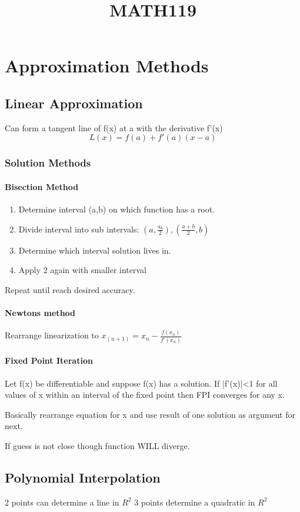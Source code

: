 \documentclass{article}
\begin{document}
\title{MATH119}

\section{Approximation Methods}
\subsection{Linear Approximation}
Can form a tangent line of f(x) at a with the derivative f'(x)
\begin{equation}
L(x)=f(a)+f'(a)(x-a)
\end{equation}
\subsubsection{Solution Methods}
\paragraph{Bisection Method}
\begin{enumerate}
\item Determine interval (a,b) on which function has a root.
\item Divide interval into sub intervals: $(a,\frac{a_b}{2}),(\frac{a+b}{2},b)$
\item Determine which interval solution lives in.
\item Apply 2 again with smaller interval
\end{enumerate}
Repeat until reach desired accuracy.
\paragraph{Newtons method}
Rearrange linearization to $x_(n+1)=x_n-\frac{f(x_n)}{f'(x_n)}$
\paragraph{Fixed Point Iteration}
Let f(x) be differentiable and suppose f(x) has a solution. If |f'(x)|<1 for all values of x within an interval of the fixed point then FPI converges for any x.

Basically rearrange equation for x and use result of one solution as argument for next.

If guess is not close though function WILL diverge.
\subsection{Polynomial Interpolation}
2 points can determine a line in $R^2$
3 points determine a quadratic in $R^2$
\end{document}
